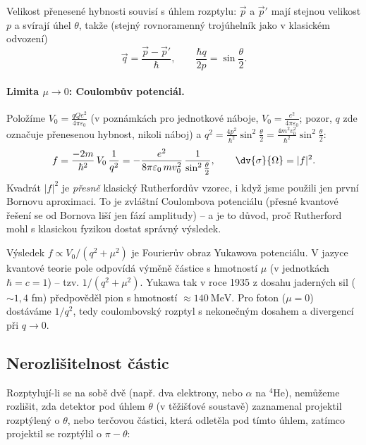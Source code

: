 Velikost přenesené hybnosti souvisí s úhlem rozptylu: $\vec p$ a $\vec p'$ mají stejnou velikost $p$ a svírají úhel $\theta$, takže (stejný rovnoramenný trojúhelník jako v klasickém odvození)
\[
  \vec q = \frac{\vec p-\vec p'}{\hbar},\qquad \frac{\hbar q}{2p} = \sin\frac{\theta}{2}.
\]

\paragraph{Limita $\mu\to0$: Coulombův potenciál.} Položíme $V_0 = \frac{qQe^2}{4\pi\varepsilon_0}$ (v poznámkách pro jednotkové náboje, $V_0=\frac{e^2}{4\pi\varepsilon_0}$; pozor, $q$ zde označuje přenesenou hybnost, nikoli náboj) a $q^2 = \frac{4p^2}{\hbar^2}\sin^2\frac\theta2 = \frac{4m^2v_0^2}{\hbar^2}\sin^2\frac\theta2$:
\begin{equation}
  f = \frac{-2m}{\hbar^2}\,V_0\,\frac{1}{q^2} = -\frac{e^2}{8\pi\varepsilon_0\,m v_0^2}\,\frac{1}{\sin^2\frac{\theta}{2}},
  \qquad
  \dv{\sigma}{\Omega} = |f|^2 .
\end{equation}
Kvadrát $|f|^2$ je \emph{přesně} klasický Rutherfordův vzorec, i když jsme použili jen první Bornovu aproximaci. To je zvláštní  Coulombova potenciálu (přesné kvantové řešení se od Bornova liší jen fází amplitudy) -- a je to důvod, proč Rutherford mohl s klasickou fyzikou dostat správný výsledek.

\begin{vysvetleni}
Výsledek $f\propto V_0/(q^2+\mu^2)$ je Fourierův obraz Yukawova potenciálu. V jazyce kvantové teorie pole odpovídá výměně částice s hmotností $\mu$ (v jednotkách $\hbar=c=1$) -- tzv.  $1/(q^2+\mu^2)$. Yukawa tak v roce 1935 z dosahu jaderných sil ($\sim 1{,}4$ fm) předpověděl pion s hmotností $\approx 140\ \mathrm{MeV}$. Pro foton ($\mu=0$) dostáváme $1/q^2$, tedy coulombovský rozptyl s nekonečným dosahem a divergencí při $q\to 0$.
\end{vysvetleni}

\subsection{Nerozlišitelnost částic}

Rozptylují-li se na sobě dvě  (např. dva elektrony, nebo $\alpha$ na $^4$He), nemůžeme rozlišit, zda detektor pod úhlem $\theta$ (v těžišťové soustavě) zaznamenal projektil rozptýlený o $\theta$, nebo terčovou částici, která odletěla pod tímto úhlem, zatímco projektil se rozptýlil o $\pi-\theta$:

